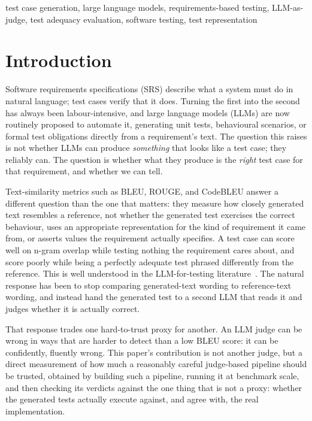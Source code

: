 \documentclass[conference]{IEEEtran}
\begin{document}
  \begin{IEEEkeywords}
  test case generation, large language models, requirements-based testing,
  LLM-as-judge, test adequacy evaluation, software testing, test representation
  \end{IEEEkeywords}

  \section{Introduction}

  Software requirements specifications (SRS) describe what a system must do in
  natural language; test cases verify that it does. Turning the first into the
  second has always been labour-intensive, and large language models (LLMs) are
  now routinely proposed to automate it, generating unit tests, behavioural
  scenarios, or formal test obligations directly from a requirement's text. The
  question this raises is not whether LLMs can produce \emph{something} that
  looks like a test case; they reliably can. The question is whether what they
  produce is the \emph{right} test case for that requirement, and whether we can
  tell.

  Text-similarity metrics such as BLEU, ROUGE, and CodeBLEU answer a different
  question than the one that matters: they measure how closely generated text
  resembles a reference, not whether the generated test exercises the correct
  behaviour, uses an appropriate representation for the kind of requirement it
  came from, or asserts values the requirement actually specifies. A test case
  can score well on n-gram overlap while testing nothing the requirement cares
  about, and score poorly while being a perfectly adequate test phrased
  differently from the reference. This is well understood in the LLM-for-testing
  literature~\cite{roy2024empirical}. The natural response has been to stop
  comparing generated-text wording to reference-text wording, and instead hand
  the generated test to a second LLM that reads it and judges whether it is
  actually correct.

  That response trades one hard-to-trust proxy for another. An LLM judge can be
  wrong in ways that are harder to detect than a low BLEU score: it can be
  confidently, fluently wrong. This paper's contribution is not another judge,
  but a direct measurement of how much a reasonably careful judge-based pipeline
  should be trusted, obtained by building such a pipeline, running it at
  benchmark scale, and then checking its verdicts against the one thing that is
  not a proxy: whether the generated tests actually execute against, and
  agree with, the real implementation.
\end{document}
